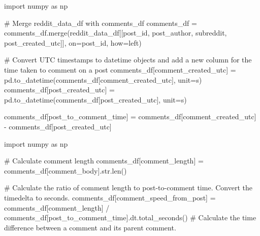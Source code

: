 \documentclass[
  12pt,
  letterpaper,
  DIV=11,
  numbers=noendperiod]{scrartcl}
\newenvironment{Shaded}{\begin{snugshade}}{\end{snugshade}}
\newcommand{\BuiltInTok}[1]{\textcolor[rgb]{0.00,0.23,0.31}{#1}}
\newcommand{\CommentTok}[1]{\textcolor[rgb]{0.37,0.37,0.37}{#1}}
\newcommand{\ImportTok}[1]{\textcolor[rgb]{0.00,0.46,0.62}{#1}}
\newcommand{\NormalTok}[1]{\textcolor[rgb]{0.00,0.23,0.31}{#1}}
\newcommand{\OperatorTok}[1]{\textcolor[rgb]{0.37,0.37,0.37}{#1}}
\newcommand{\StringTok}[1]{\textcolor[rgb]{0.13,0.47,0.30}{#1}}
\begin{document}
\begin{Shaded}
\begin{Highlighting}[]
\ImportTok{import}\NormalTok{ numpy }\ImportTok{as}\NormalTok{ np}

\CommentTok{\# Merge reddit\_data\_df with comments\_df}
\NormalTok{comments\_df }\OperatorTok{=}\NormalTok{ comments\_df.merge(reddit\_data\_df[[}\StringTok{\textquotesingle{}post\_id\textquotesingle{}}\NormalTok{, }\StringTok{\textquotesingle{}post\_author\textquotesingle{}}\NormalTok{, }\StringTok{\textquotesingle{}subreddit\textquotesingle{}}\NormalTok{, }\StringTok{\textquotesingle{}post\_created\_utc\textquotesingle{}}\NormalTok{]], on}\OperatorTok{=}\StringTok{\textquotesingle{}post\_id\textquotesingle{}}\NormalTok{, how}\OperatorTok{=}\StringTok{\textquotesingle{}left\textquotesingle{}}\NormalTok{)}

\CommentTok{\# Convert UTC timestamps to datetime objects and add a new column for the time taken to comment on a post}
\NormalTok{comments\_df[}\StringTok{\textquotesingle{}comment\_created\_utc\textquotesingle{}}\NormalTok{] }\OperatorTok{=}\NormalTok{ pd.to\_datetime(comments\_df[}\StringTok{\textquotesingle{}comment\_created\_utc\textquotesingle{}}\NormalTok{], unit}\OperatorTok{=}\StringTok{\textquotesingle{}s\textquotesingle{}}\NormalTok{)}
\NormalTok{comments\_df[}\StringTok{\textquotesingle{}post\_created\_utc\textquotesingle{}}\NormalTok{] }\OperatorTok{=}\NormalTok{ pd.to\_datetime(comments\_df[}\StringTok{\textquotesingle{}post\_created\_utc\textquotesingle{}}\NormalTok{], unit}\OperatorTok{=}\StringTok{\textquotesingle{}s\textquotesingle{}}\NormalTok{)}

\NormalTok{comments\_df[}\StringTok{\textquotesingle{}post\_to\_comment\_time\textquotesingle{}}\NormalTok{] }\OperatorTok{=}\NormalTok{ comments\_df[}\StringTok{\textquotesingle{}comment\_created\_utc\textquotesingle{}}\NormalTok{] }\OperatorTok{{-}}\NormalTok{ comments\_df[}\StringTok{\textquotesingle{}post\_created\_utc\textquotesingle{}}\NormalTok{]}

\ImportTok{import}\NormalTok{ numpy }\ImportTok{as}\NormalTok{ np}

\CommentTok{\# Calculate comment length}
\NormalTok{comments\_df[}\StringTok{\textquotesingle{}comment\_length\textquotesingle{}}\NormalTok{] }\OperatorTok{=}\NormalTok{ comments\_df[}\StringTok{\textquotesingle{}comment\_body\textquotesingle{}}\NormalTok{].}\BuiltInTok{str}\NormalTok{.}\BuiltInTok{len}\NormalTok{()}

\CommentTok{\# Calculate the ratio of comment length to post{-}to{-}comment time.  Convert the timedelta to seconds.}
\NormalTok{comments\_df[}\StringTok{\textquotesingle{}comment\_speed\_from\_post\textquotesingle{}}\NormalTok{] }\OperatorTok{=}\NormalTok{ comments\_df[}\StringTok{\textquotesingle{}comment\_length\textquotesingle{}}\NormalTok{] }\OperatorTok{/}\NormalTok{ comments\_df[}\StringTok{\textquotesingle{}post\_to\_comment\_time\textquotesingle{}}\NormalTok{].dt.total\_seconds()}
\CommentTok{\# Calculate the time difference between a comment and its parent comment.}


\end{Highlighting}
\end{Shaded}
\end{document}
